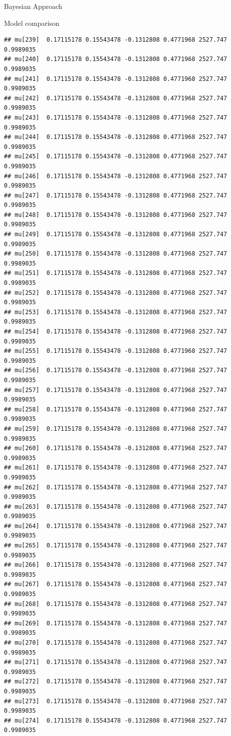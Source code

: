 \documentclass[
  ignorenonframetext,
]{beamer}
\begin{document}
\begin{frame}[fragile]{Bayesian Approach}
\begin{block}{Model comparison}
\begin{verbatim}
## mu[239]  0.17115178 0.15543478 -0.1312808 0.4771968 2527.747 0.9989035
## mu[240]  0.17115178 0.15543478 -0.1312808 0.4771968 2527.747 0.9989035
## mu[241]  0.17115178 0.15543478 -0.1312808 0.4771968 2527.747 0.9989035
## mu[242]  0.17115178 0.15543478 -0.1312808 0.4771968 2527.747 0.9989035
## mu[243]  0.17115178 0.15543478 -0.1312808 0.4771968 2527.747 0.9989035
## mu[244]  0.17115178 0.15543478 -0.1312808 0.4771968 2527.747 0.9989035
## mu[245]  0.17115178 0.15543478 -0.1312808 0.4771968 2527.747 0.9989035
## mu[246]  0.17115178 0.15543478 -0.1312808 0.4771968 2527.747 0.9989035
## mu[247]  0.17115178 0.15543478 -0.1312808 0.4771968 2527.747 0.9989035
## mu[248]  0.17115178 0.15543478 -0.1312808 0.4771968 2527.747 0.9989035
## mu[249]  0.17115178 0.15543478 -0.1312808 0.4771968 2527.747 0.9989035
## mu[250]  0.17115178 0.15543478 -0.1312808 0.4771968 2527.747 0.9989035
## mu[251]  0.17115178 0.15543478 -0.1312808 0.4771968 2527.747 0.9989035
## mu[252]  0.17115178 0.15543478 -0.1312808 0.4771968 2527.747 0.9989035
## mu[253]  0.17115178 0.15543478 -0.1312808 0.4771968 2527.747 0.9989035
## mu[254]  0.17115178 0.15543478 -0.1312808 0.4771968 2527.747 0.9989035
## mu[255]  0.17115178 0.15543478 -0.1312808 0.4771968 2527.747 0.9989035
## mu[256]  0.17115178 0.15543478 -0.1312808 0.4771968 2527.747 0.9989035
## mu[257]  0.17115178 0.15543478 -0.1312808 0.4771968 2527.747 0.9989035
## mu[258]  0.17115178 0.15543478 -0.1312808 0.4771968 2527.747 0.9989035
## mu[259]  0.17115178 0.15543478 -0.1312808 0.4771968 2527.747 0.9989035
## mu[260]  0.17115178 0.15543478 -0.1312808 0.4771968 2527.747 0.9989035
## mu[261]  0.17115178 0.15543478 -0.1312808 0.4771968 2527.747 0.9989035
## mu[262]  0.17115178 0.15543478 -0.1312808 0.4771968 2527.747 0.9989035
## mu[263]  0.17115178 0.15543478 -0.1312808 0.4771968 2527.747 0.9989035
## mu[264]  0.17115178 0.15543478 -0.1312808 0.4771968 2527.747 0.9989035
## mu[265]  0.17115178 0.15543478 -0.1312808 0.4771968 2527.747 0.9989035
## mu[266]  0.17115178 0.15543478 -0.1312808 0.4771968 2527.747 0.9989035
## mu[267]  0.17115178 0.15543478 -0.1312808 0.4771968 2527.747 0.9989035
## mu[268]  0.17115178 0.15543478 -0.1312808 0.4771968 2527.747 0.9989035
## mu[269]  0.17115178 0.15543478 -0.1312808 0.4771968 2527.747 0.9989035
## mu[270]  0.17115178 0.15543478 -0.1312808 0.4771968 2527.747 0.9989035
## mu[271]  0.17115178 0.15543478 -0.1312808 0.4771968 2527.747 0.9989035
## mu[272]  0.17115178 0.15543478 -0.1312808 0.4771968 2527.747 0.9989035
## mu[273]  0.17115178 0.15543478 -0.1312808 0.4771968 2527.747 0.9989035
## mu[274]  0.17115178 0.15543478 -0.1312808 0.4771968 2527.747 0.9989035

\end{verbatim}
\end{block}
\end{frame}
\end{document}
